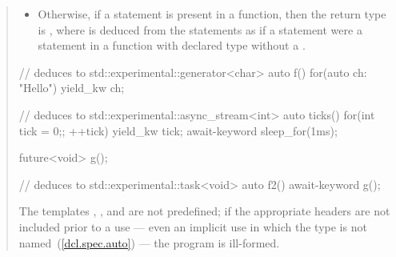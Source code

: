 \begin{quote}
\begin{itemize}

\item Otherwise, if a  statement is present in a function, then the return type is \linebreak
{},
where  is deduced from the  statements  as if a  statement were a  statement in a function with declared type  without a .

\end{itemize}
\enterexample
\begin{codeblock}
// deduces to std::experimental::generator<char>
auto f() { for(auto ch: "Hello") yield_kw ch; }

// deduces to std::experimental::async_stream<int>
auto ticks() {
  for(int tick = 0;; ++tick) {
    yield_kw tick;
    await-keyword sleep_for(1ms);
  }
}

future<void> g();

// deduces to std::experimental::task<void>
auto f2() {  await-keyword g(); }

\end{codeblock}
\exitexample

\pnum
The templates  , 
, and \linebreak
{} are not predefined;
if the appropriate headers are not included prior to a use --- even an implicit use in which the type is not
named~(\ref{dcl.spec.auto}) --- the program is ill-formed.
\end{quote}
